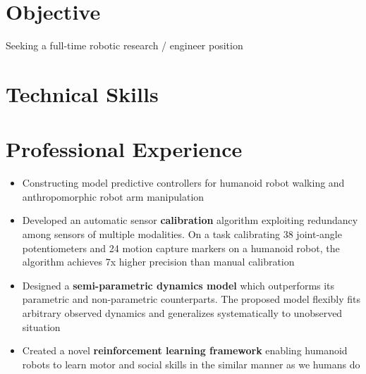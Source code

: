 \documentclass[11pt,letterpaper,sans]{moderncv}
\title{}
\begin{document}
\begin{CJK*}{UTF8}{bkai}
\makecvtitle
\end{CJK*}

\vspace{-10mm}

\section{Objective}
Seeking a full-time robotic research / engineer position %

\section{Technical Skills}

	
\section{Professional Experience}
	{
		\begin{itemize}
		\item Constructing model predictive controllers for humanoid robot walking and anthropomorphic robot arm manipulation
		\end{itemize}
	}
	{
	  \begin{itemize}%
	  \item Developed an automatic sensor \textbf{calibration} algorithm exploiting redundancy among sensors of multiple modalities. On a task calibrating 38 joint-angle potentiometers and 24 motion capture markers on a humanoid robot, the algorithm achieves  7x higher precision than manual calibration
	  \item Designed a \textbf{semi-parametric dynamics model} which outperforms its parametric and non-parametric counterparts. The proposed model  flexibly fits arbitrary observed dynamics  and  generalizes systematically to unobserved situation 
	  \item Created a novel \textbf{reinforcement learning framework} enabling  humanoid robots to learn motor and social skills in the similar manner as we humans do
	  \end{itemize}
	}
	
\end{document}
